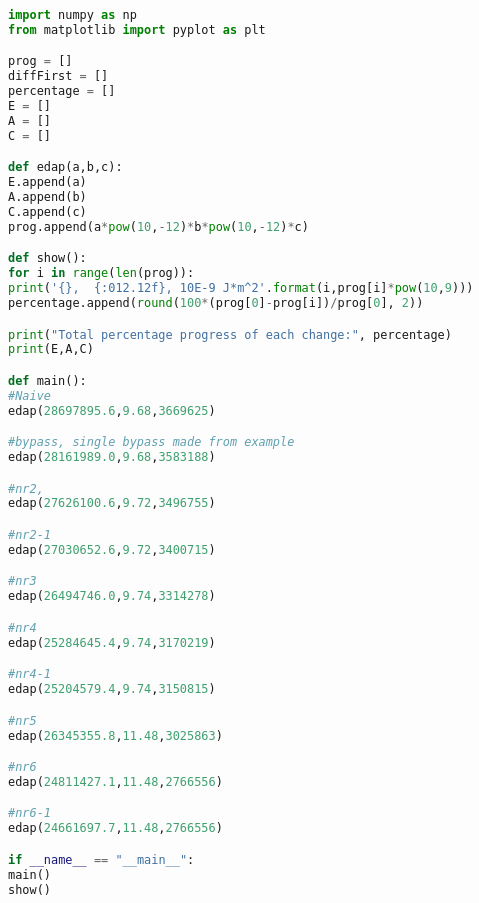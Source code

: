 \documentclass[conference]{IEEEtran}
\begin{document}
\begin{lstlisting}[basicstyle=\tiny,language=python,caption={Start the 6lbr service and check the status}]
import numpy as np
from matplotlib import pyplot as plt

prog = []
diffFirst = []
percentage = []
E = []
A = []
C = []

def edap(a,b,c):
E.append(a)
A.append(b)
C.append(c)
prog.append(a*pow(10,-12)*b*pow(10,-12)*c)

def show():
for i in range(len(prog)):
print('{},  {:012.12f}, 10E-9 J*m^2'.format(i,prog[i]*pow(10,9)))
percentage.append(round(100*(prog[0]-prog[i])/prog[0], 2))

print("Total percentage progress of each change:", percentage)
print(E,A,C)

def main():
#Naive
edap(28697895.6,9.68,3669625)

#bypass, single bypass made from example
edap(28161989.0,9.68,3583188)

#nr2,
edap(27626100.6,9.72,3496755)

#nr2-1
edap(27030652.6,9.72,3400715)

#nr3 
edap(26494746.0,9.74,3314278)

#nr4 
edap(25284645.4,9.74,3170219)

#nr4-1
edap(25204579.4,9.74,3150815)

#nr5 
edap(26345355.8,11.48,3025863)

#nr6 
edap(24811427.1,11.48,2766556)

#nr6-1 
edap(24661697.7,11.48,2766556)	

if __name__ == "__main__":
main()
show()
\end{lstlisting}
\end{document}
